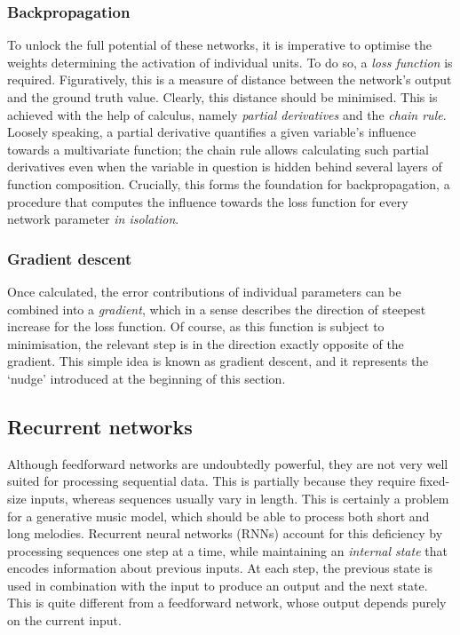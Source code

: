 \documentclass[../../report.tex]{subfiles}
\begin{document}
\subsubsection{Backpropagation}
To unlock the full potential of these networks, it is imperative to optimise the
weights determining the activation of individual units. To do so, a \emph{loss
function} is required. Figuratively, this is a measure of distance between the
network's output and the ground truth value. Clearly, this distance should be
minimised. This is achieved with the help of calculus, namely \emph{partial
derivatives} and the \emph{chain rule}. Loosely speaking, a partial derivative
quantifies a given variable's influence towards a multivariate function; the
chain rule allows calculating such partial derivatives even when the variable in
question is hidden behind several layers of function composition. Crucially,
this forms the foundation for backpropagation, a procedure that computes the
influence towards the loss function for every network parameter \emph{in
isolation}.

\subsubsection{Gradient descent}
Once calculated, the error contributions of individual parameters can be
combined into a \emph{gradient}, which in a sense describes the direction of
steepest increase\footnotemark{} for the loss function. Of course, as this
function is subject to minimisation, the relevant step is in the direction
exactly opposite of the gradient. This simple idea is known as gradient descent,
and it represents the `nudge' introduced at the beginning of this section.



\subsection{Recurrent networks}

Although feedforward networks are undoubtedly powerful, they are not very well
suited for processing sequential data. This is partially because they require
fixed-size inputs, whereas sequences usually vary in length. This is certainly a
problem for a generative music model, which should be able to process both short
and long melodies. Recurrent neural networks (RNNs) account for this deficiency
by processing sequences one step at a time, while maintaining an \emph{internal
state} that encodes information about previous inputs. At each step, the
previous state is used in combination with the input to produce an output and
the next state. This is quite different from a feedforward network, whose output
depends purely on the current input.
\end{document}
